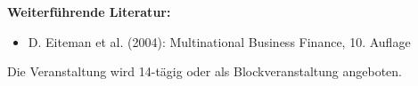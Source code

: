\begin{course}
\begin{content}
\end{content}



\begin{literature}\textbf{Weiterführende Literatur:}

 \begin{itemize}\item D. Eiteman et al. (2004): Multinational Business Finance, 10. Auflage  \end{itemize}\end{literature}

\begin{remarks}Die Veranstaltung wird 14-tägig oder als Blockveranstaltung angeboten.

\end{remarks}

\end{course}